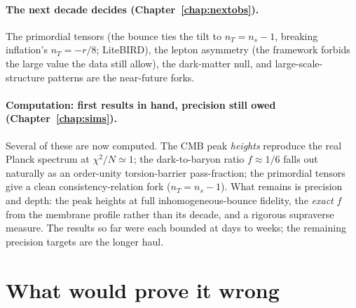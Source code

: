 \paragraph{The next decade decides (Chapter~\ref{chap:nextobs}).} The primordial
tensors (the bounce ties the tilt to $n_T=n_s-1$, breaking inflation's $n_T=-r/8$;
LiteBIRD), the lepton
asymmetry (the framework forbids the large value the data still allow), the
dark-matter null, and large-scale-structure patterns are the near-future forks.

\paragraph{Computation: first results in hand, precision still owed
(Chapter~\ref{chap:sims}).} Several of these are now computed. The CMB peak
\emph{heights} reproduce the real Planck spectrum at $\chi^2/N\simeq1$; the
dark-to-baryon ratio $f\approx1/6$ falls out naturally as an order-unity
torsion-barrier pass-fraction; the primordial tensors give a clean
consistency-relation fork ($n_T=n_s-1$). What remains is precision and depth: the
peak heights at full inhomogeneous-bounce fidelity, the \emph{exact} $f$ from the
membrane profile rather than its decade, and a rigorous supraverse measure. The
results so far were each bounded at days to weeks; the remaining precision targets
are the longer haul.

\section{What would prove it wrong}

